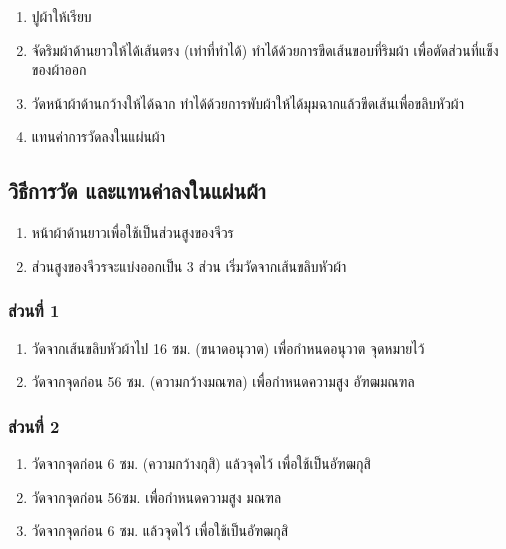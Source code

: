 \begin{enumerate}
\def\labelenumi{(\arabic{enumi})}
\item
  ปูผ้าให้เรียบ
\item
  จัดริมผ้าด้านยาวให้ได้เส้นตรง (เท่าที่ทำได้) ทำได้ด้วยการขีดเส้นขอบที่ริมผ้า
  เพื่อตัดส่วนที่แข็งของผ้าออก
\item
  วัดหน้าผ้าด้านกว้างให้ได้ฉาก ทำได้ด้วยการพับผ้าให้ได้มุมฉากแล้วขีดเส้นเพื่อขลิบหัวผ้า
\item
  แทนค่าการวัดลงในแผ่นผ้า
\end{enumerate}

\subsection{วิธีการวัด และแทนค่าลงในแผ่นผ้า}

\begin{enumerate}
\def\labelenumi{(\arabic{enumi})}
\item
  หน้าผ้าด้านยาวเพื่อใช้เป็นส่วนสูงของจีวร
\item
  ส่วนสูงของจีวรจะแบ่งออกเป็น 3 ส่วน เริ่มวัดจากเส้นขลิบหัวผ้า
\end{enumerate}

\subsubsection{ส่วนที่ 1}

\begin{enumerate}
\def\labelenumi{(\arabic{enumi})}
\item
  วัดจากเส้นขลิบหัวผ้าไป 16 ซม. (ขนาดอนุวาต) เพื่อกำหนดอนุวาต จุดหมายไว้
\item
  วัดจากจุดก่อน 56 ซม. (ความกว้างมณฑล) เพื่อกำหนดความสูง อัฑฒมณฑล
\end{enumerate}

\subsubsection{ส่วนที่ 2}

\begin{enumerate}
\def\labelenumi{(\arabic{enumi})}
\item
  วัดจากจุดก่อน 6 ซม. (ความกว้างกุสิ) แล้วจุดไว้ เพื่อใช้เป็นอัฑฒกุสิ
\item
  วัดจากจุดก่อน 56ซม. เพื่อกำหนดความสูง มณฑล
\item
  วัดจากจุดก่อน 6 ซม. แล้วจุดไว้ เพื่อใช้เป็นอัฑฒกุสิ
\end{enumerate}

